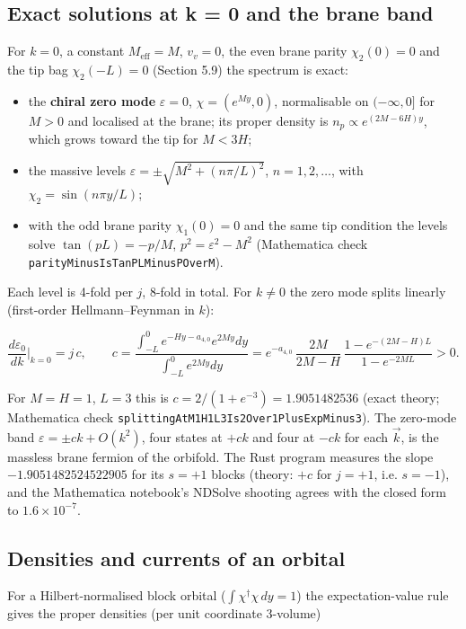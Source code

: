 \documentclass[11pt]{article}
\begin{document}
\subsection{Exact solutions at k = 0 and the brane band}

For $k=0$, a constant $M_{\mathrm{eff}}=M$, $v_v=0$, the even brane parity $\chi_2(0)=0$ and the tip bag $\chi_2(-L)=0$ (Section 5.9) the spectrum is exact:

\begin{itemize}
\item the \textbf{chiral zero mode} $\varepsilon=0$, $\chi=(e^{My},0)$, normalisable on $(-\infty,0]$ for $M>0$ and localised at the brane; its proper density is $n_p\propto e^{(2M-6H)y}$, which grows toward the tip for $M<3H$;
\item the massive levels $\varepsilon=\pm\sqrt{M^2+(n\pi/L)^2}$, $n=1,2,\dots$, with $\chi_2=\sin(n\pi y/L)$;
\item with the odd brane parity $\chi_1(0)=0$ and the same tip condition the levels solve $\tan(pL)=-p/M$, $p^2=\varepsilon^2-M^2$ (Mathematica check \texttt{parityMi\allowbreak{}nusIsTan\allowbreak{}PLMinusP\allowbreak{}OverM}).
\end{itemize}

Each level is 4-fold per $j$, 8-fold in total. For $k\ne0$ the zero mode splits linearly (first-order Hellmann--Feynman in $k$):

\[
\frac{d\varepsilon_0}{dk}\Big|_{k=0}=j\,c,\qquad c=\frac{\int_{-L}^0e^{-Hy-a_{4,0}}e^{2My}dy}{\int_{-L}^0e^{2My}dy}=e^{-a_{4,0}}\,\frac{2M}{2M-H}\,\frac{1-e^{-(2M-H)L}}{1-e^{-2ML}}>0 .
\]

For $M=H=1$, $L=3$ this is $c=2/(1+e^{-3})=1.9051482536$ (exact theory; Mathematica check \texttt{splittin\allowbreak{}gAtM1H1L\allowbreak{}3Is2Over\allowbreak{}1PlusExp\allowbreak{}Minus3}). The zero-mode band $\varepsilon=\pm ck+O(k^2)$, four states at $+ck$ and four at $-ck$ for each $\vec k$, is the massless brane fermion of the orbifold. The Rust program measures the slope $-1.9051482524522905$ for its $s=+1$ blocks (theory: $+c$ for $j=+1$, i.e. $s=-1$), and the Mathematica notebook's NDSolve shooting agrees with the closed form to $1.6\times10^{-7}$.

\subsection{Densities and currents of an orbital}

For a Hilbert-normalised block orbital ($\int\chi^\dagger\chi\,dy=1$) the expectation-value rule gives the proper densities (per unit coordinate 3-volume)
\end{document}
